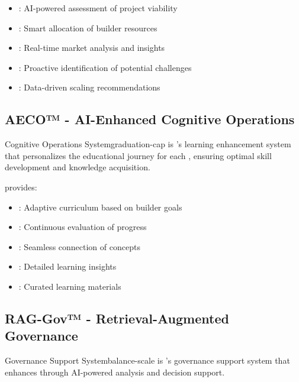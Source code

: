 \begin{itemize}[leftmargin=*]
\item {}: AI-powered assessment of project viability
\item {}: Smart allocation of builder resources
\item {}: Real-time market analysis and insights
\item {}: Proactive identification of potential challenges
\item {}: Data-driven scaling recommendations
\end{itemize}

\subsection{AECO™ - AI-Enhanced Cognitive Operations}

\begin{mfai-box-learn}{Cognitive Operations System}{graduation-cap}
 is 's learning enhancement system that personalizes the educational journey for each , ensuring optimal skill development and knowledge acquisition.
\end{mfai-box-learn}

 provides:

\begin{itemize}[leftmargin=*]
\item {}: Adaptive curriculum based on builder goals
\item {}: Continuous evaluation of progress
\item {}: Seamless connection of concepts
\item {}: Detailed learning insights
\item {}: Curated learning materials
\end{itemize}

\subsection{RAG-Gov™ - Retrieval-Augmented Governance}

\begin{mfai-box-prove}{Governance Support System}{balance-scale}
 is 's governance support system that enhances  through AI-powered analysis and decision support.
\end{mfai-box-prove}

